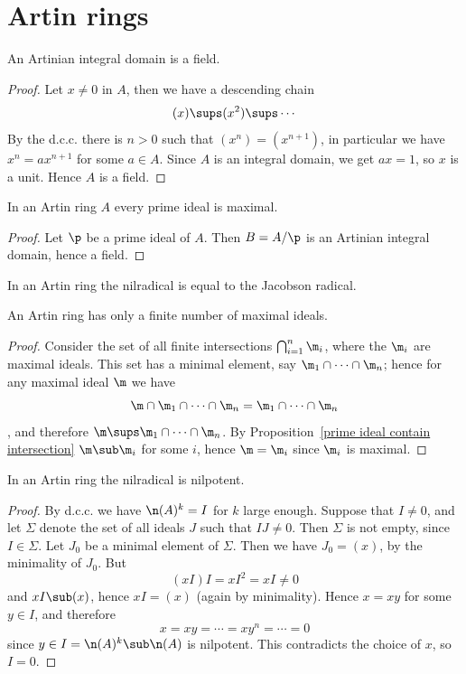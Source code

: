 \section{Artin rings}
\begin{proposition}\label{Artinian domain is field}
An Artinian integral domain is a field.
\end{proposition}
\begin{proof}
Let $x\neq 0$ in $A$, then we have a descending chain
\[(x)\sups(x^2)\sups\cdots\]
By the d.c.c. there is $n>0$ such that $(x^n)=(x^{n+1})$, in particular we have $x^{n}=ax^{n+1}$ for some $a\in A$. Since $A$ is an integral domain, we get $ax=1$, so $x$ is a unit. Hence $A$ is a field.
\end{proof}
\begin{proposition}\label{Artinian prime ideal is maximal}
In an Artin ring $A$ every prime ideal is maximal.
\end{proposition}
\begin{proof}
Let $\p$ be a prime ideal of $A$. Then $B=A/\p$ is an Artinian integral domain, hence a field.
\end{proof}
\begin{corollary}
In an Artin ring the nilradical is equal to the Jacobson radical.
\end{corollary}
\begin{proposition}\label{Artinian maximal ideal finitely many}
An Artin ring has only a finite number of maximal ideals.
\end{proposition}
\begin{proof}
Consider the set of all finite intersections $\bigcap_{i=1}^n\m_i$, where the $\m_i$ are maximal ideals. This set has a minimal element, say $\m_1\cap\cdots\cap\m_n$; hence for any maximal ideal $\m$ we have 
\[\m\cap\m_1\cap\cdots\cap\m_n=\m_1\cap\cdots\cap\m_n\], and therefore $\m\sups\m_1\cap\cdots\cap\m_n$. By Proposition~\ref{prime ideal contain intersection} $\m\sub\m_i$ for some $i$, hence $\m=\m_i$ since $\m_i$ is maximal.
\end{proof}
\begin{proposition}\label{Artinian nilradical is nilpotent}
In an Artin ring the nilradical is nilpotent.
\end{proposition}
\begin{proof}
By d.c.c. we have $\n(A)^k=I$ for $k$ large enough. Suppose that $I\neq 0$, and let $\Sigma$ denote the set of all ideals $J$ such that $IJ\neq 0$. Then $\Sigma$ is not empty, since $I\in\Sigma$. Let $J_0$ be a minimal element of $\Sigma$. Then we have $J_0=(x)$, by the minimality of $J_0$. But
\[(xI)I=xI^2=xI\neq 0\]
and $xI\sub(x)$, hence $xI=(x)$ (again by minimality). Hence $x=xy$ for some $y\in I$, and therefore
\[x=xy=\cdots=xy^n=\cdots=0\]
since $y\in I=\n(A)^k\sub \n(A)$ is nilpotent. This contradicts the choice of $x$, so $I=0$.
\end{proof}
